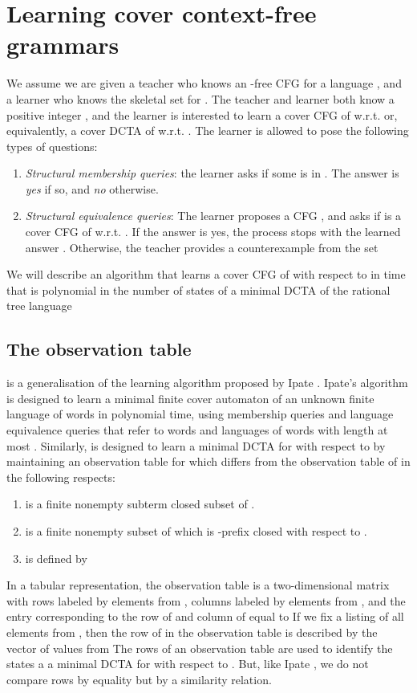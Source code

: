 \documentclass[preprint,12pt,english]{article}
\begin{document}
\section{Learning cover context-free grammars}
\label{sect4}
We assume we are given a teacher who knows an -free CFG  for a language , and a learner who  knows the skeletal set  for .  
The teacher and learner both know a positive integer , and the learner is interested to learn a cover CFG  of  w.r.t.  or, equivalently, a cover DCTA of  w.r.t. .
The learner is allowed to pose the following types of questions:
\begin{enumerate}
\item {\em Structural membership queries}: the learner asks if some  is in . The answer is {\em yes} if so, and {\em no} otherwise.
\item {\em Structural equivalence queries}: The learner proposes a CFG , and asks if  is a cover CFG of  w.r.t. .  If the answer is {yes}, the  process stops with the learned answer . Otherwise, the teacher provides a counterexample from the set  
\end{enumerate}
We will describe an algorithm  that learns a cover CFG of  with respect to  in time that is polynomial in the number of states of a minimal DCTA of the rational tree language 
\subsection{The observation table}
 is a generalisation of the learning algorithm  proposed by Ipate \cite{Ipate:2012}. Ipate's algorithm is designed to learn a minimal finite cover automaton of an unknown finite language of words in polynomial time, using membership queries and language equivalence queries that refer to words and languages of words with  length at most . Similarly,   is designed to learn a minimal DCTA  for  with respect to  by maintaining an observation table  for  which differs from the observation table of  in the following respects:
\begin{enumerate}
\item  is a finite nonempty subterm closed subset of . 
\item   is a finite nonempty  subset of  which is -prefix closed with respect to .
\item  is defined by 

\end{enumerate}
In a tabular representation, the observation table  is a two-dimensional matrix with rows labeled by elements from , columns labeled by elements from , and the entry corresponding to the row of  and column of  equal to 
If we fix a listing  of all elements from , then the row of  in the observation table is described by the vector  of values from  The rows of an observation table are used to identify the states a a minimal DCTA for  with respect to . But, like Ipate \cite{Ipate:2012}, we do not compare rows by equality but by a similarity relation. 
\end{document}
